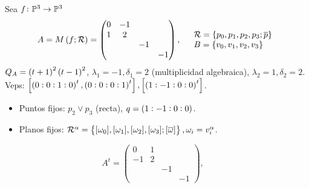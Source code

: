 \begin{example}
	Sea $f \colon \mathbb{P}^3 \to \mathbb{P}^3$ \\
	\[
		A = M\left( f; \mathcal{R}\right) = \begin{pmatrix}
		0 & -1 & & \\
		1 & 2 & & \\
		& & -1 & \\
		& & & -1
		\end{pmatrix}, \quad \begin{array}{l}
		\mathcal{R} = \{p_0, p_1, p_2, p_3; \overline{p}\} \\
		B = \{v_0, v_1, v_2, v_3\}
		\end{array}
	\]
	$Q_A = \left( t+1\right)^2\left( t-1\right)^2$, $\lambda_1 = -1, \delta_1 = 2 $ (multiplicidad algebraica), $\lambda_2 = 1, \delta_2 = 2$. Veps: $\left[ \left(0:0:1:0\right)^t, \left(0:0:0:1\right)^t \right], \left[ \left(1:-1:0:0\right)^t \right]$.
	\begin{itemize}
		\item Puntos fijos: $p_2 \vee p_3$ (recta), $q =\left( 1:-1:0:0\right)$.
		\item Planos fijos: $\mathcal{R}^\alpha = \left\{ [\omega_0], [\omega_1], [\omega_2], [\omega_3]; [\overline{\omega}]\right\}, \omega_i = v_i^\alpha$.
	\end{itemize}
	\[
		A^t = \begin{pmatrix}
			0 & 1 & & \\
			-1 & 2 & & \\
			& & -1 & \\
			& & & -1
		\end{pmatrix}, \quad
	\]
\end{example}




























